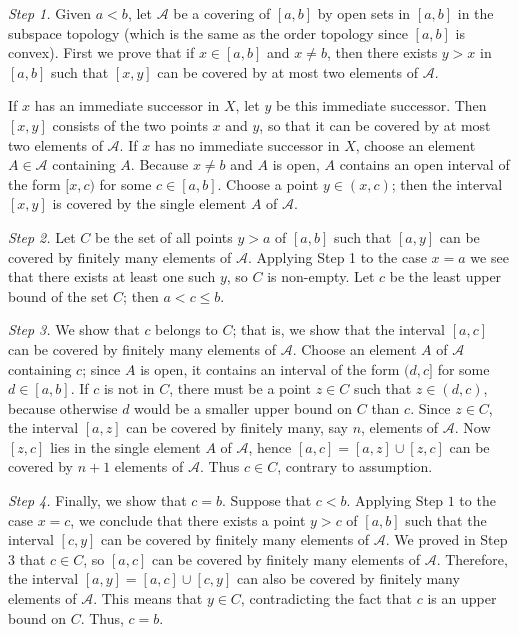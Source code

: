 \documentclass[12pt, a4paper, twoside, openright, titlepage]{book}
\begin{document}
\begin{proof*}{}{}
    \emph{Step 1.} Given $a < b$, let $\mathcal{A}$ be a covering of $[a,b]$ by open sets in $[a,b]$ in the subspace topology (which is the same as the order topology since $[a,b]$ is convex). First we prove that if $x \in [a,b]$ and $x \neq b$, then there exists $y > x$ in $[a,b]$ such that $[x,y]$ can be covered by at most two elements of $\mathcal{A}$.

    If $x$ has an immediate successor in $X$, let $y$ be this immediate successor. Then $[x,y]$ consists of the two points $x$ and $y$, so that it can be covered by at most two elements of $\mathcal{A}$. If $x$ has no immediate successor in $X$, choose an element $A \in \mathcal{A}$ containing $A$. Because $x \neq b$ and $A$ is open, $A$ contains an open interval of the form $[x,c)$ for some $c \in [a,b]$. Choose a point $y \in (x,c)$; then the interval $[x,y]$ is covered by the single element $A$ of $\mathcal{A}$.

    \emph{Step 2.} Let $C$ be the set of all points $y > a$ of $[a,b]$ such that $[a,y]$ can be covered by finitely many elements of $\mathcal{A}$. Applying Step 1 to the case $x = a$ we see that there exists at least one such $y$, so $C$ is non-empty. Let $c$ be the least upper bound of the set $C$; then $a < c \leq b$.

    \emph{Step 3.} We show that $c$ belongs to $C$; that is, we show that the interval $[a,c]$ can be covered by finitely many elements of $\mathcal{A}$. Choose an element $A$ of $\mathcal{A}$ containing $c$; since $A$ is open, it contains an interval of the form $(d,c]$ for some $d \in [a,b]$. If $c$ is not in $C$, there must be a point $z \in C$ such that $z \in (d,c)$, because otherwise $d$ would be a smaller upper bound on $C$ than $c$. Since $z \in C$, the interval $[a,z]$ can be covered by finitely many, say $n$, elements of $\mathcal{A}$. Now $[z,c]$ lies in the single element $A$ of $\mathcal{A}$, hence $[a,c] = [a,z]\cup[z,c]$ can be covered by $n+1$ elements of $\mathcal{A}$. Thus $c \in C$, contrary to assumption.

    \emph{Step 4.} Finally, we show that $c = b$. Suppose that $c < b$. Applying Step $1$ to the case $x = c$, we conclude that there exists a point $y > c$ of $[a,b]$ such that the interval $[c,y]$ can be covered by finitely many elements of $\mathcal{A}$. We proved in Step 3 that $c \in C$, so $[a,c]$ can be covered by finitely many elements of $\mathcal{A}$. Therefore, the interval $[a,y] = [a,c] \cup [c,y]$ can also be covered by finitely many elements of $\mathcal{A}$. This means that $y \in C$, contradicting the fact that $c$ is an upper bound on $C$. Thus, $c = b$.
\end{proof*}
\end{document}
